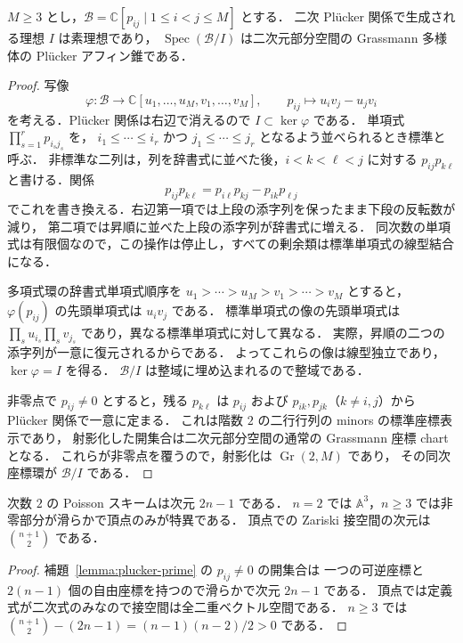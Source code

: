 \begin{lemma}
\label{lemma:plucker-prime}
$M\geq3$ とし，$\mathcal B=\mathbb C[p_{ij}\mid1\leq i<j\leq M]$ とする．
二次 Pl\"ucker 関係で生成される理想 $I$ は素理想であり，
$\operatorname{Spec}(\mathcal B/I)$ は二次元部分空間の Grassmann 多様体の
Pl\"ucker アフィン錐である．
\end{lemma}

\begin{proof}
写像
\[
 \varphi:\mathcal B\longrightarrow
 \mathbb C[u_1,\ldots,u_M,v_1,\ldots,v_M],
 \qquad p_{ij}\longmapsto u_iv_j-u_jv_i
\]
を考える．Pl\"ucker 関係は右辺で消えるので $I\subset\ker\varphi$ である．
単項式 $\prod_{s=1}^r p_{i_sj_s}$ を，
$i_1\leq\cdots\leq i_r$ かつ $j_1\leq\cdots\leq j_r$
となるよう並べられるとき標準と呼ぶ．
非標準な二列は，列を辞書式に並べた後，$i<k<\ell<j$ に対する
$p_{ij}p_{k\ell}$ と書ける．関係
\[
 p_{ij}p_{k\ell}=p_{i\ell}p_{kj}-p_{ik}p_{\ell j}
\]
でこれを書き換える．右辺第一項では上段の添字列を保ったまま下段の反転数が減り，
第二項では昇順に並べた上段の添字列が辞書式に増える．
同次数の単項式は有限個なので，この操作は停止し，すべての剰余類は標準単項式の線型結合になる．

多項式環の辞書式単項式順序を
$u_1>\cdots>u_M>v_1>\cdots>v_M$ とすると，
$\varphi(p_{ij})$ の先頭単項式は $u_iv_j$ である．
標準単項式の像の先頭単項式は
$\prod_su_{i_s}\prod_sv_{j_s}$ であり，異なる標準単項式に対して異なる．
実際，昇順の二つの添字列が一意に復元されるからである．
よってこれらの像は線型独立であり，$\ker\varphi=I$ を得る．
$\mathcal B/I$ は整域に埋め込まれるので整域である．

非零点で $p_{ij}\ne0$ とすると，残る $p_{k\ell}$ は
$p_{ij}$ および $p_{ik},p_{jk}$（$k\ne i,j$）から Pl\"ucker 関係で一意に定まる．
これは階数 $2$ の二行行列の minors の標準座標表示であり，
射影化した開集合は二次元部分空間の通常の Grassmann 座標 chart となる．
これらが非零点を覆うので，射影化は $\operatorname{Gr}(2,M)$ であり，
その同次座標環が $\mathcal B/I$ である．
\end{proof}

\begin{corollary}[大きさと特異点]
\label{cor:poisson-scheme-dimension}
次数 $2$ の Poisson スキームは次元 $2n-1$ である．
$n=2$ では $\mathbb A^3$，$n\geq3$ では非零部分が滑らかで頂点のみが特異である．
頂点での Zariski 接空間の次元は $\binom{n+1}{2}$ である．
\end{corollary}

\begin{proof}
補題~\ref{lemma:plucker-prime} の $p_{ij}\ne0$ の開集合は
一つの可逆座標と $2(n-1)$ 個の自由座標を持つので滑らかで次元 $2n-1$ である．
頂点では定義式が二次式のみなので接空間は全二重ベクトル空間である．
$n\geq3$ では
$\binom{n+1}{2}-(2n-1)=(n-1)(n-2)/2>0$ である．
\end{proof}

